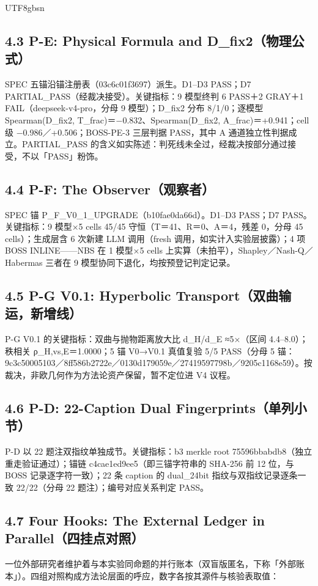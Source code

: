 \documentclass[10pt,a4paper]{article}
\begin{document}
\begin{CJK}{UTF8}{gbsn}
\subsection*{4.3 P-E: Physical Formula and D\_fix2（物理公式）}SPEC 五锚沿锚注册表（03c6c01f3697）派生。D1–D3 PASS；D7 PARTIAL\_PASS（经裁决接受）。关键指标：9 模型终判 6 PASS＋2 GRAY＋1 FAIL（deepseek-v4-pro，分母 9 模型）；D\_fix2 分布 8/1/0；逐模型 Spearman(D\_fix2, T\_frac)＝−0.832、Spearman(D\_fix2, A\_frac)＝+0.941；cell 级 −0.986／+0.506；BOSS-PE-3 三层判据 PASS，其中 A 通道独立性判据成立。PARTIAL\_PASS 的含义如实陈述：判死线未全过，经裁决按部分通过接受，不以「PASS」粉饰。

\subsection*{4.4 P-F: The Observer（观察者）}SPEC 锚 P\_F\_V0\_1\_UPGRADE（b10fae0da66d）。D1–D3 PASS；D7 PASS。关键指标：9 模型×5 cells 45/45 守恒（T＝41、R＝0、A＝4，残差 0，分母 45 cells）；生成层含 6 次新建 LLM 调用（fresh 调用，如实计入实验层披露）；4 项 BOSS INLINE——NBS 在 1 模型×5 cells 上实算（未拍平），Shapley／Nash-Q／Habermas 三者在 9 模型协同下退化，均按预登记判定记录。

\subsection*{4.5 P-G V0.1: Hyperbolic Transport（双曲输运，新增线）}P-G V0.1 的关键指标：双曲与抛物距离放大比 d\_H/d\_E ≈5×（区间 4.4–8.0）；秩相关 ρ\_H,vs,E＝1.0000；5 锚 V0→V0.1 真值复验 5/5 PASS（分母 5 锚：9c3c50005103／8ff586b2722e／0130d179059e／27419597798b／9205c1168e59）。按裁决，非欧几何作为方法论资产保留，暂不定位进 V4 议程。

\subsection*{4.6 P-D: 22-Caption Dual Fingerprints（单列小节）}P-D 以 22 题注双指纹单独成节。关键指标：b3 merkle root 75596bbabdb8（独立重走验证通过）；锚链 c4cae1ed9ee5（即三锚字符串的 SHA-256 前 12 位，与 BOSS 记录逐字符一致）；22 条 caption 的 dual\_24bit 指纹与双指纹记录逐条一致 22/22（分母 22 题注）；编号对应关系判定 PASS。

\subsection*{4.7 Four Hooks: The External Ledger in Parallel（四挂点对照）}一位外部研究者维护着与本实验同命题的并行账本（双盲版匿名，下称「外部账本」）。四组对照构成方法论层面的呼应，数字各按其源件与核验表取值：


\end{CJK}
\end{document}
